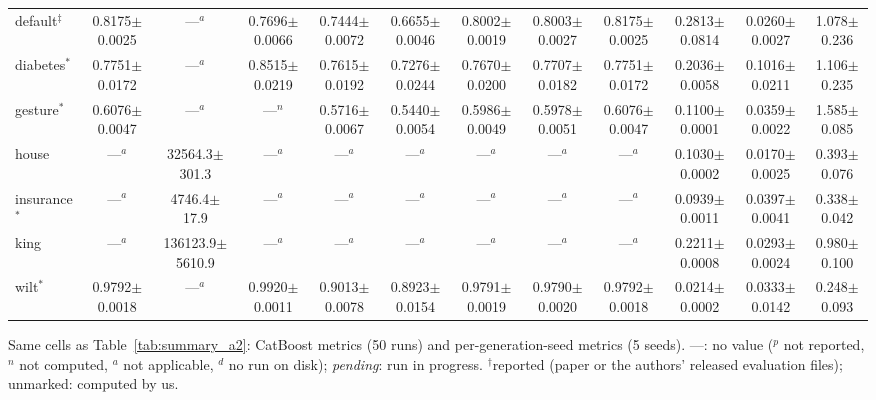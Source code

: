 \begin{table}[t]
{\begin{tabular}{lccccccccccc}
default$^\ddagger$ & 0.8175{\scriptsize$\pm$0.0025} & ---$^{a}$ & 0.7696{\scriptsize$\pm$0.0066} & 0.7444{\scriptsize$\pm$0.0072} & 0.6655{\scriptsize$\pm$0.0046} & 0.8002{\scriptsize$\pm$0.0019} & 0.8003{\scriptsize$\pm$0.0027} & 0.8175{\scriptsize$\pm$0.0025} & 0.2813{\scriptsize$\pm$0.0814} & 0.0260{\scriptsize$\pm$0.0027} & 1.078{\scriptsize$\pm$0.236} \\
diabetes$^{*}$ & 0.7751{\scriptsize$\pm$0.0172} & ---$^{a}$ & 0.8515{\scriptsize$\pm$0.0219} & 0.7615{\scriptsize$\pm$0.0192} & 0.7276{\scriptsize$\pm$0.0244} & 0.7670{\scriptsize$\pm$0.0200} & 0.7707{\scriptsize$\pm$0.0182} & 0.7751{\scriptsize$\pm$0.0172} & 0.2036{\scriptsize$\pm$0.0058} & 0.1016{\scriptsize$\pm$0.0211} & 1.106{\scriptsize$\pm$0.235} \\
gesture$^{*}$ & 0.6076{\scriptsize$\pm$0.0047} & ---$^{a}$ & ---$^{n}$ & 0.5716{\scriptsize$\pm$0.0067} & 0.5440{\scriptsize$\pm$0.0054} & 0.5986{\scriptsize$\pm$0.0049} & 0.5978{\scriptsize$\pm$0.0051} & 0.6076{\scriptsize$\pm$0.0047} & 0.1100{\scriptsize$\pm$0.0001} & 0.0359{\scriptsize$\pm$0.0022} & 1.585{\scriptsize$\pm$0.085} \\
house & ---$^{a}$ & 32564.3{\scriptsize$\pm$301.3} & ---$^{a}$ & ---$^{a}$ & ---$^{a}$ & ---$^{a}$ & ---$^{a}$ & ---$^{a}$ & 0.1030{\scriptsize$\pm$0.0002} & 0.0170{\scriptsize$\pm$0.0025} & 0.393{\scriptsize$\pm$0.076} \\
insurance$^{*}$ & ---$^{a}$ & 4746.4{\scriptsize$\pm$17.9} & ---$^{a}$ & ---$^{a}$ & ---$^{a}$ & ---$^{a}$ & ---$^{a}$ & ---$^{a}$ & 0.0939{\scriptsize$\pm$0.0011} & 0.0397{\scriptsize$\pm$0.0041} & 0.338{\scriptsize$\pm$0.042} \\
king & ---$^{a}$ & 136123.9{\scriptsize$\pm$5610.9} & ---$^{a}$ & ---$^{a}$ & ---$^{a}$ & ---$^{a}$ & ---$^{a}$ & ---$^{a}$ & 0.2211{\scriptsize$\pm$0.0008} & 0.0293{\scriptsize$\pm$0.0024} & 0.980{\scriptsize$\pm$0.100} \\
wilt$^{*}$ & 0.9792{\scriptsize$\pm$0.0018} & ---$^{a}$ & 0.9920{\scriptsize$\pm$0.0011} & 0.9013{\scriptsize$\pm$0.0078} & 0.8923{\scriptsize$\pm$0.0154} & 0.9791{\scriptsize$\pm$0.0019} & 0.9790{\scriptsize$\pm$0.0020} & 0.9792{\scriptsize$\pm$0.0018} & 0.0214{\scriptsize$\pm$0.0002} & 0.0333{\scriptsize$\pm$0.0142} & 0.248{\scriptsize$\pm$0.093} \\
\bottomrule
\end{tabular}}
\par\smallskip\footnotesize Same cells as Table~\ref{tab:summary_a2}: CatBoost metrics (50 runs) and per-generation-seed metrics (5 seeds). ---: no value ($^{p}$ not reported, $^{n}$ not computed, $^{a}$ not applicable, $^{d}$ no run on disk); \emph{pending}: run in progress. $^\dagger$reported (paper or the authors' released evaluation files); unmarked: computed by us.
\end{table}

